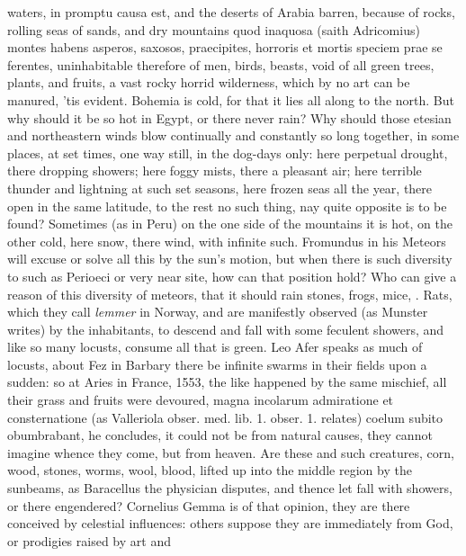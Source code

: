 {waters, in promptu causa est, and the deserts of Arabia barren, because
of rocks, rolling seas of sands, and dry mountains quod inaquosa (saith
Adricomius) montes habens asperos, saxosos, praecipites, horroris et
mortis speciem prae se ferentes, uninhabitable therefore of men, birds,
beasts, void of all green trees, plants, and fruits, a vast rocky
horrid wilderness, which by no art can be manured, 'tis evident.
Bohemia is cold, for that it lies all along to the north. But why
should it be so hot in Egypt, or there never rain? Why should those
etesian and northeastern winds blow continually and constantly so
long together, in some places, at set times, one way still, in the
dog-days only: here perpetual drought, there dropping showers; here
foggy mists, there a pleasant air; here terrible thunder and
lightning at such set seasons, here frozen seas all the year, there
open in the same latitude, to the rest no such thing, nay quite
opposite is to be found? Sometimes (as in Peru) on the one side
of the mountains it is hot, on the other cold, here snow, there wind,
with infinite such. Fromundus in his Meteors will excuse or solve all
this by the sun's motion, but when there is such diversity to such as
Perioeci or very near site, how can that position hold?
Who can give a reason of this diversity of meteors, that it should rain
stones, frogs, mice, \etc{}. Rats, which they call \emph{lemmer} in
Norway, and are manifestly observed (as Munster writes) by the
inhabitants, to descend and fall with some feculent showers, and like
so many locusts, consume all that is green. Leo Afer speaks as much of
locusts, about Fez in Barbary there be infinite swarms in their fields
upon a sudden: so at Aries in France, 1553, the like happened by the
same mischief, all their grass and fruits were devoured, magna
incolarum admiratione et consternatione (as Valleriola obser. med. lib.
1. obser. 1. relates) coelum subito obumbrabant, \etc{} he concludes,
it could not be from natural causes, they cannot imagine whence
they come, but from heaven. Are these and such creatures, corn, wood,
stones, worms, wool, blood, \etc{} lifted up into the middle region by the
sunbeams, as Baracellus the physician disputes, and thence let
fall with showers, or there engendered? Cornelius Gemma is of
that opinion, they are there conceived by celestial influences: others
suppose they are immediately from God, or prodigies raised by art and
}
